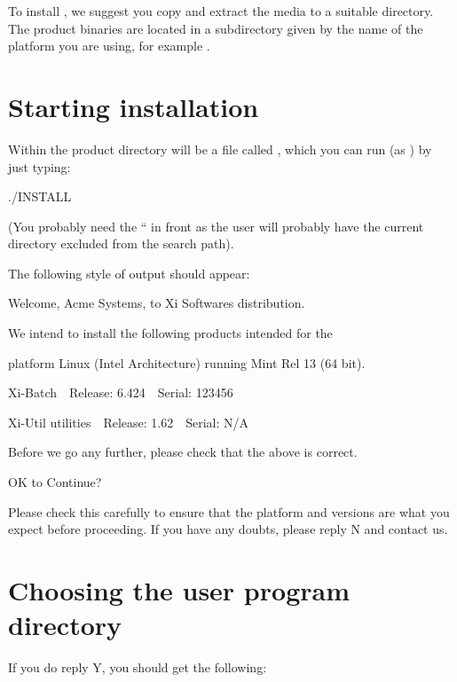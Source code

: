 {To install \ProductName{}, we suggest you copy and extract the media to a
suitable directory. The product binaries are located in a subdirectory
given by the name of the platform you are using, for example
.

\section{Starting installation}
Within the product directory will be a file called
, which you can run (as
) by just typing:

\begin{expara}
./INSTALL

\end{expara}

(You probably need the
{\textquotedblleft} in front
as the  user will probably have the current directory excluded from
the search path).

The following style of output should appear:

\begin{expara}
Welcome, Acme Systems, to Xi Software{\textquotesingle}s distribution.


\bigskip

We intend to install the following products intended for the

platform Linux (Intel Architecture) running Mint Rel 13 (64 bit).


\bigskip

Xi-Batch\ \ Release: 6.424\ \ Serial: 123456

Xi-Util utilities\ \ Release: 1.62\ \ Serial: N/A

\bigskip

Before we go any further, please check that the above is correct.

OK to Continue?

\end{expara}

Please check this carefully to ensure that the platform and versions are
what you expect before proceeding. If you have any doubts, please reply
N and contact us.

\section{Choosing the user program directory}
If you do reply Y, you should get the following:

}
